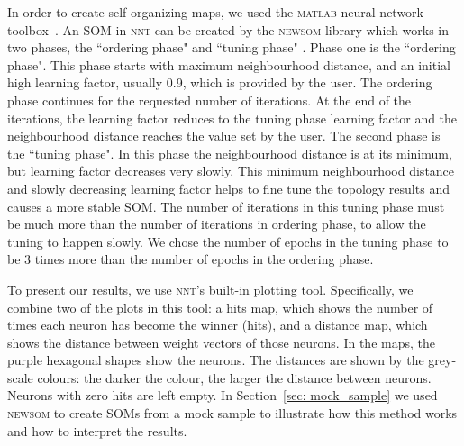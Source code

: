      In order to create self-organizing maps, we used the \textsc{ matlab} neural network toolbox~\citep[NNT,][]{matlabtolbox}.
     An SOM in \textsc{ nnt} can be created by the \textsc{ newsom} library which works in two phases, the ``ordering phase" and ``tuning phase" . 
     Phase one is the ``ordering phase". 
     This phase starts with maximum neighbourhood distance, and an initial high learning factor, usually 0.9, which is provided by the user. 
     The ordering phase continues for the requested number of iterations.
     At the end of the iterations, the learning factor reduces to the tuning phase learning factor and the neighbourhood distance reaches the value set by the user. 
     The second phase is the ``tuning phase".
     In this phase the neighbourhood distance is at its minimum, but learning factor decreases very slowly.
     This minimum neighbourhood distance and slowly decreasing learning factor helps to fine tune the topology results and causes a more stable SOM. 
     The number of iterations in this tuning phase must be much more than the number of iterations in ordering phase, to allow the tuning to happen slowly. 
     We chose the number of epochs in the tuning phase to be 3 times more than the number of epochs in the ordering phase.
     
     To present our results, we use \textsc{nnt}'s built-in plotting tool.
     Specifically, we combine two of the plots in this tool: a hits map, which shows the number of times each neuron has become the winner (hits), and a distance map, which shows the distance between weight vectors of those neurons.
     In the maps, the purple hexagonal shapes show the neurons. 
     The distances are shown by the grey-scale colours: the darker the colour, the larger the distance between neurons.
     Neurons with zero hits are left empty.
     In Section~\ref{sec: mock_sample} we used \textsc{newsom} to create SOMs from a mock sample to illustrate how this method works and how to interpret the results.

